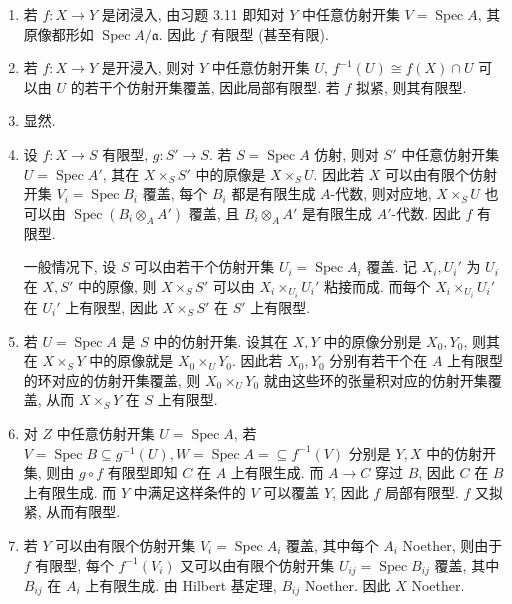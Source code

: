 \documentclass{article}
\theoremstyle{exercise}
\newenvironment{proofc}{\proof}{\endproof}
\def\ga{\mathfrak{a}}
\def\Spec{\operatorname{Spec}}
\begin{document}
\begin{proofc}
  \begin{enumerate}[label={(\alph*)}]
    \item 若 $f \colon X \to Y$ 是闭浸入,
          由习题 3.11 即知对 $Y$ 中任意仿射开集 $V = \Spec A$,
          其原像都形如 $\Spec A / \ga$. 因此 $f$ 有限型 (甚至有限).
    \item 若 $f \colon X \to Y$ 是开浸入,
          则对 $Y$ 中任意仿射开集 $U$, $f^{-1}(U) \cong f(X) \cap U$
          可以由 $U$ 的若干个仿射开集覆盖, 因此局部有限型.
          若 $f$ 拟紧, 则其有限型.
    \item 显然.
    \item 设 $f \colon X \to S$ 有限型, $g \colon S' \to S$.
          若 $S = \Spec A$ 仿射, 则对 $S'$ 中任意仿射开集 $U = \Spec A'$,
          其在 $X \times_S S'$ 中的原像是 $X \times_S U$.
          因此若 $X$ 可以由有限个仿射开集 $V_i = \Spec B_i$ 覆盖,
          每个 $B_i$ 都是有限生成 $A$-代数,
          则对应地, $X \times_S U$ 也可以由 $\Spec (B_i \otimes_A A')$ 覆盖,
          且 $B_i \otimes_A A'$ 是有限生成 $A'$-代数.
          因此 $f$ 有限型.

          一般情况下, 设 $S$ 可以由若干个仿射开集 $U_i = \Spec A_i$ 覆盖.
          记 $X_i, U_i'$ 为 $U_i$ 在 $X, S'$ 中的原像,
          则 $X \times_S S'$ 可以由 $X_i \times_{U_i} U_i'$ 粘接而成.
          而每个 $X_i \times_{U_i} U_i'$ 在 $U_i'$ 上有限型,
          因此 $X \times_S S'$ 在 $S'$ 上有限型.
    \item 若 $U = \Spec A$ 是 $S$ 中的仿射开集.
          设其在 $X, Y$ 中的原像分别是 $X_0, Y_0$,
          则其在 $X \times_S Y$ 中的原像就是 $X_0 \times_U Y_0$.
          因此若 $X_0, Y_0$ 分别有若干个在 $A$ 上有限型的环对应的仿射开集覆盖,
          则 $X_0 \times_U Y_0$ 就由这些环的张量积对应的仿射开集覆盖,
          从而 $X \times_S Y$ 在 $S$ 上有限型.
    \item 对 $Z$ 中任意仿射开集 $U = \Spec A$,
          若 $V = \Spec B \subseteq g^{-1}(U), W = \Spec A = \subseteq f^{-1}(V)$
          分别是 $Y, X$ 中的仿射开集,
          则由 $g \circ f$ 有限型即知 $C$ 在 $A$ 上有限生成.
          而 $A \to C$ 穿过 $B$, 因此 $C$ 在 $B$ 上有限生成.
          而 $Y$ 中满足这样条件的 $V$ 可以覆盖 $Y$, 因此 $f$ 局部有限型.
          $f$ 又拟紧, 从而有限型.
    \item 若 $Y$ 可以由有限个仿射开集 $V_i = \Spec A_i$ 覆盖,
          其中每个 $A_i$ Noether, 则由于 $f$ 有限型,
          每个 $f^{-1}(V_i)$ 又可以由有限个仿射开集 $U_{ij} = \Spec B_{ij}$ 覆盖,
          其中 $B_{ij}$ 在 $A_i$ 上有限生成. 由 Hilbert 基定理, $B_{ij}$ Noether.
          因此 $X$ Noether.
          \qedhere
  \end{enumerate}
\end{proofc}
\end{document}
